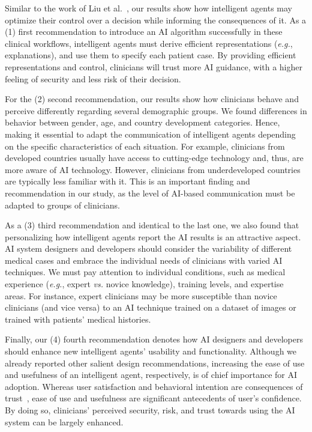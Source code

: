 \vspace{1.00mm}

Similar to the work of Liu et al.~\cite{LIU2022107026}, our results show how intelligent agents may optimize their control over a decision while informing the consequences of it.
As a (1) first recommendation to introduce an AI algorithm successfully in these clinical workflows, intelligent agents must derive efficient representations ({\it e.g.}, explanations), and use them to specify each patient case.
By providing efficient representations and control, clinicians will trust more AI guidance, with a higher feeling of security and less risk of their decision.

For the (2) second recommendation, our results show how clinicians behave and perceive differently regarding several demographic groups.
We found differences in behavior between gender, age, and country development categories.
Hence, making it essential to adapt the communication of intelligent agents depending on the specific characteristics of each situation.
For example, clinicians from developed countries usually have access to cutting-edge technology and, thus, are more aware of AI technology. However, clinicians from underdeveloped countries are typically less familiar with it.
This is an important finding and recommendation in our study, as the level of AI-based communication must be adapted to groups of clinicians.

As a (3) third recommendation and identical to the last one, we also found that personalizing how intelligent agents report the AI results is an attractive aspect.
AI system designers and developers should consider the variability of different medical cases and embrace the individual needs of clinicians with varied AI techniques.
We must pay attention to individual conditions, such as medical experience ({\it e.g.}, expert {\it vs.} novice knowledge), training levels, and expertise areas.
For instance, expert clinicians may be more susceptible than novice clinicians (and vice versa) to an AI technique trained on a dataset of images or trained with patients' medical histories.

Finally, our (4) fourth recommendation denotes how AI designers and developers should enhance new intelligent agents' usability and functionality.
Although we already reported other salient design recommendations, increasing the ease of use and usefulness of an intelligent agent, respectively, is of chief importance for AI adoption.
Whereas user satisfaction and behavioral intention are consequences of trust~\cite{LIU2022107026, LV2022106993}, ease of use and usefulness are significant antecedents of user's confidence.
By doing so, clinicians' perceived security, risk, and trust towards using the AI system can be largely enhanced.

